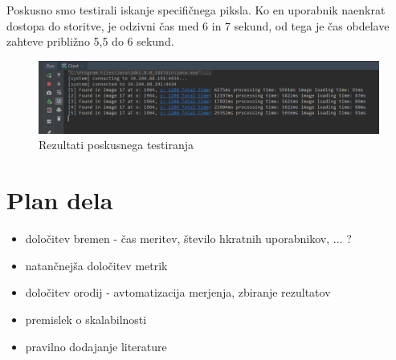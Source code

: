 Poskusno smo testirali iskanje specifičnega piksla.
Ko en uporabnik naenkrat dostopa do storitve, je odzivni čas med 6 in 7 sekund, od tega je čas obdelave zahteve približno 5,5 do 6 sekund.

\begin{figure}[H]
    \centering
    \includegraphics[scale=0.3]{Img/1_preliminary_test.png}
    \caption{Rezultati poskusnega testiranja}
    \label{fig:1_preliminary_test}
\end{figure}

\section{Plan dela}

\begin{itemize}
\item določitev bremen - čas meritev, število hkratnih uporabnikov, ... ?
\item natančnejša določitev metrik 
\item določitev orodij - avtomatizacija merjenja, zbiranje rezultatov
\item premislek o skalabilnosti
\item pravilno dodajanje literature
\end{itemize}

